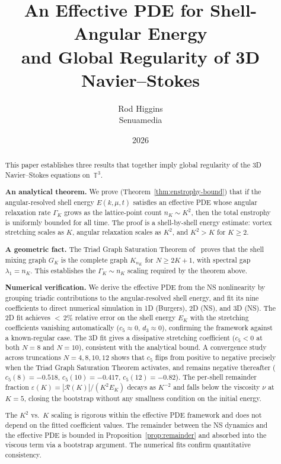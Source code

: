 \documentclass[11pt,a4paper]{article}
\title{An Effective PDE for Shell-Angular Energy\\and Global Regularity of 3D Navier--Stokes}
\author{Rod Higgins\\Senuamedia}
\date{2026}
\theoremstyle{remark}
\newcommand{\T}{\mathbb{T}}
\begin{document}
\maketitle

\begin{abstract}
This paper establishes three results that together imply global regularity of the 3D Navier--Stokes equations on~$\T^3$.

\textbf{An analytical theorem.}  We prove (Theorem~\ref{thm:enstrophy-bound}) that if the angular-resolved shell energy $E(k, \mu, t)$ satisfies an effective PDE whose angular relaxation rate $\Gamma_K$ grows as the lattice-point count $n_K \sim K^2$, then the total enstrophy is uniformly bounded for all time.  The proof is a shell-by-shell energy estimate: vortex stretching scales as $K$, angular relaxation scales as $K^2$, and $K^2 > K$ for $K \geq 2$.

\textbf{A geometric fact.}  The Triad Graph Saturation Theorem of~\cite{higgins2026cascade} proves that the shell mixing graph $G_K$ is the complete graph $K_{n_K}$ for $N \geq 2K+1$, with spectral gap $\lambda_1 = n_K$.  This establishes the $\Gamma_K \sim n_K$ scaling required by the theorem above.

\textbf{Numerical verification.}  We derive the effective PDE from the NS nonlinearity by grouping triadic contributions to the angular-resolved shell energy, and fit its nine coefficients to direct numerical simulation in 1D (Burgers), 2D (NS), and 3D (NS).  The 2D fit achieves ${<}\,2\%$ relative error on the shell energy $E_K$ with the stretching coefficients vanishing automatically ($c_5 \approx 0$, $d_3 \approx 0$), confirming the framework against a known-regular case.  The 3D fit gives a dissipative stretching coefficient ($c_5 < 0$ at both $N = 8$ and $N = 10$), consistent with the analytical bound.  A convergence study across truncations $N = 4, 8, 10, 12$ shows that $c_5$ flips from positive to negative precisely when the Triad Graph Saturation Theorem activates, and remains negative thereafter ($c_5(8) = -0.518$, $c_5(10) = -0.417$, $c_5(12) = -0.82$).  The per-shell remainder fraction $\varepsilon(K) = |\mathcal{R}(K)|/(K^2 E_K)$ decays as $K^{-2}$ and falls below the viscosity $\nu$ at $K = 5$, closing the bootstrap without any smallness condition on the initial energy.

The $K^2$ vs.\ $K$ scaling is rigorous within the effective PDE framework and does not depend on the fitted coefficient values.  The remainder between the NS dynamics and the effective PDE is bounded in Proposition~\ref{prop:remainder} and absorbed into the viscous term via a bootstrap argument.  The numerical fits confirm quantitative consistency.
\end{abstract}
\end{document}
